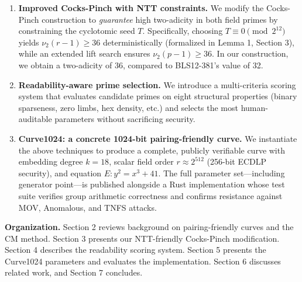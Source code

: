 \begin{enumerate}
\def\labelenumi{\arabic{enumi}.}
\item
  \textbf{Improved Cocks-Pinch with NTT constraints.} We modify the
  Cocks-Pinch construction to \emph{guarantee} high two-adicity in both
  field primes by constraining the cyclotomic seed \(T\). Specifically,
  choosing \(T \equiv 0 \pmod{2^{12}}\) yields \(\nu_2(r-1) \geq 36\)
  deterministically (formalized in Lemma 1, Section 3), while an
  extended lift search ensures \(\nu_2(p-1) \geq 36\). In our
  construction, we obtain a two-adicity of 36, compared to BLS12-381's
  value of 32.
\item
  \textbf{Readability-aware prime selection.} We introduce a
  multi-criteria scoring system that evaluates candidate primes on eight
  structural properties (binary sparseness, zero limbs, hex density,
  etc.) and selects the most human-auditable parameters without
  sacrificing security.
\item
  \textbf{Curve1024: a concrete 1024-bit pairing-friendly curve.} We
  instantiate the above techniques to produce a complete, publicly
  verifiable curve with embedding degree \(k=18\), scalar field order
  \(r \approx 2^{512}\) (256-bit ECDLP security), and equation
  \(E: y^2 = x^3 + 41\). The full parameter set---including generator
  point---is published alongside a Rust implementation whose test suite
  verifies group arithmetic correctness and confirms resistance against
  MOV, Anomalous, and TNFS attacks.
\end{enumerate}

\textbf{Organization.} Section 2 reviews background on pairing-friendly
curves and the CM method. Section 3 presents our NTT-friendly
Cocks-Pinch modification. Section 4 describes the readability scoring
system. Section 5 presents the Curve1024 parameters and evaluates the
implementation. Section 6 discusses related work, and Section 7
concludes.
